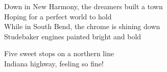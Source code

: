 \begin{lyrics}
Down in New Harmony, the dreamers built a town\\
Hoping for a perfect world to hold\\
While in South Bend, the chrome is shining down\\
Studebaker engines painted bright and bold

Five sweet stops on a northern line\\
Indiana highway, feeling so fine!
\end{lyrics}
